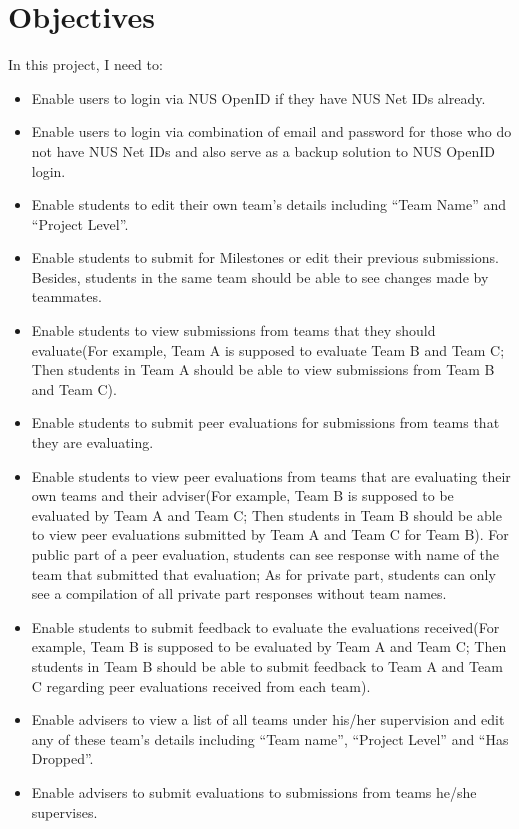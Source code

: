 \section{Objectives}

In this project, I need to:
\begin{itemize}
  \item Enable users to login via NUS OpenID if they have NUS Net IDs already.
  \item Enable users to login via combination of email and password for those who do not have NUS Net IDs and also serve as a backup solution to NUS OpenID login.
  \item Enable students to edit their own team's details including ``Team Name'' and ``Project Level''.
  \item Enable students to submit for Milestones or edit their previous submissions. Besides, students in the same team should be able to see changes made by teammates.
  \item Enable students to view submissions from teams that they should evaluate(For example, Team A is supposed to evaluate Team B and Team C; Then students in Team A should be able to view submissions from Team B and Team C).
  \item Enable students to submit peer evaluations for submissions from teams that they are evaluating.
  \item Enable students to view peer evaluations from teams that are evaluating their own teams and their adviser(For example, Team B is supposed to be evaluated by Team A and Team C; Then students in Team B should be able to view peer evaluations submitted by Team A and Team C for Team B). For public part of a peer evaluation, students can see response with name of the team that submitted that evaluation; As for private part, students can only see a compilation of all private part responses without team names.
  \item Enable students to submit feedback to evaluate the evaluations received(For example, Team B is supposed to be evaluated by Team A and Team C; Then students in Team B should be able to submit feedback to Team A and Team C regarding peer evaluations received from each team).
  \item Enable advisers to view a list of all teams under his/her supervision and edit any of these team's details including ``Team name'', ``Project Level'' and ``Has Dropped''.
  \item Enable advisers to submit evaluations to submissions from teams he/she supervises.

\end{itemize}
